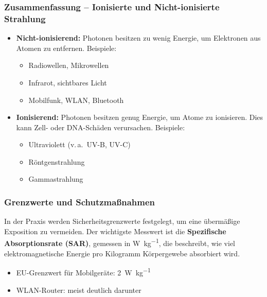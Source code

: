 \subsubsection{Zusammenfassung -- Ionisierte und   Nicht-ionisierte Strahlung}
\medskip
\begin{tcolorbox}[physikbox,title=Ionisierende und Nicht-ionisierende Strahlung]
	\label{box:ionisierende}
	\begin{itemize}
		\item \textbf{Nicht-ionisierend:} Photonen besitzen zu wenig Energie, um Elektronen aus Atomen zu entfernen. Beispiele:
		\begin{itemize}
			\item Radiowellen, Mikrowellen
			\item Infrarot, sichtbares Licht
			\item Mobilfunk, WLAN, Bluetooth
		\end{itemize}
		\item \textbf{Ionisierend:} Photonen besitzen genug Energie, um Atome zu ionisieren. Dies kann Zell- oder DNA-Schäden verursachen. Beispiele:
		\begin{itemize}
			\item Ultraviolett (v.\,a.\ UV-B, UV-C)
			\item Röntgenstrahlung
			\item Gammastrahlung
		\end{itemize}
	\end{itemize}
\end{tcolorbox}
\medskip
\subsubsection{Grenzwerte und Schutzmaßnahmen}

In der Praxis werden Sicherheitsgrenzwerte festgelegt, um eine übermäßige Exposition zu vermeiden. Der wichtigste Messwert ist die \textbf{Spezifische Absorptionsrate (SAR)}, gemessen in \si{\watt\per\kilogram}, die beschreibt, wie viel elektromagnetische Energie pro Kilogramm Körpergewebe absorbiert wird.

\begin{itemize}
	\item EU-Grenzwert für Mobilgeräte: \SI{2}{\watt\per\kilogram}
	\item WLAN-Router: meist deutlich darunter
\end{itemize}

